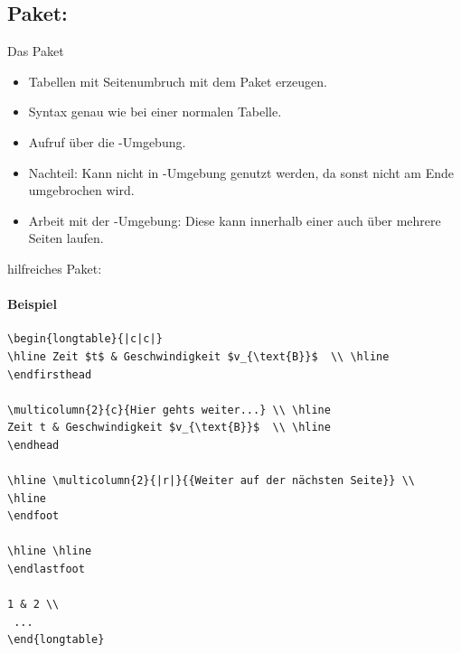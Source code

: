\subsection{Paket: }

\begin{frame}[fragile]{Das Paket }
\begin{itemize}
\item Tabellen mit Seitenumbruch mit dem Paket  erzeugen.\pause
\item Syntax genau wie bei einer normalen Tabelle. \pause
\item Aufruf über die -Umgebung. \pause
\item Nachteil: Kann nicht in -Umgebung genutzt werden, da sonst nicht am Ende umgebrochen wird.\pause
\item Arbeit mit der -Umgebung: Diese kann innerhalb einer  auch über mehrere Seiten laufen. 
\end{itemize}
\end{frame}

\begin{frame}[fragile]{hilfreiches Paket: }
\framesubtitle{Beispiel}
\footnotesize
\begin{codeblock}
\begin{Verbatim}[fontsize=\tiny]  
\begin{longtable}{|c|c|}
\hline Zeit $t$ & Geschwindigkeit $v_{\text{B}}$  \\ \hline 
\endfirsthead

\multicolumn{2}{c}{Hier gehts weiter...} \\ \hline 
Zeit t & Geschwindigkeit $v_{\text{B}}$  \\ \hline 
\endhead

\hline \multicolumn{2}{|r|}{{Weiter auf der nächsten Seite}} \\ 
\hline
\endfoot

\hline \hline
\endlastfoot

1 & 2 \\ 
 ...
\end{longtable}
\end{Verbatim}
\end{codeblock}
\end{frame}

